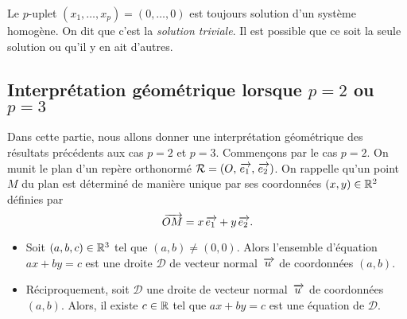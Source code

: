 \documentclass{magnolia}
\begin{document}
\begin{remarqueUnique}
\remarque Le $p$-uplet $(x_1,\ldots,x_p)=(0,\ldots,0)$ est toujours solution d'un système homogène. On dit
  que c'est la \emph{solution triviale}. Il est possible que ce soit la seule solution
  ou qu'il y en ait d'autres.
\end{remarqueUnique}





\subsection{Interprétation géométrique lorsque $p=2$ ou $p=3$}

Dans cette partie, nous allons donner une interprétation géométrique des résultats précédents aux cas $p=2$ et $p=3$. Commençons par le cas $p=2$. On munit le plan d'un repère orthonormé $\mathcal{R}=(O,\kern 2pt\overrightarrow{\kern -2pte_1},\kern 2pt\overrightarrow{\kern -2pte_2})$. On rappelle qu'un point $M$ du plan est déterminé de manière unique par ses coordonnées $(x,y)\in\mathbb{R}^2$ définies par \[\kern 2pt\overrightarrow{\kern -2ptOM}=x\kern 2pt\overrightarrow{\kern -2pte_1}+y\kern 2pt\overrightarrow{\kern -2pte_2}.\]

\begin{proposition}
\begin{itemize}
\item Soit $(a,b,c)\in\mathbb{R}^3$ tel que $(a,b)\neq(0,0)$. Alors l'ensemble d'équation $ax+by=c$ est une droite $\mathcal{D}$ de vecteur normal $\kern 2pt\overrightarrow{\kern -2ptu}$ de coordonnées $(a,b)$.
\item Réciproquement, soit $\mathcal{D}$ une droite de vecteur normal $\kern 2pt\overrightarrow{\kern -2ptu}$ de coordonnées $(a,b)$. Alors, il existe $c\in\mathbb{R}$ tel que $ax+by=c$ est une équation de $\mathcal{D}$.
\end{itemize}
\end{proposition}
\end{document}
